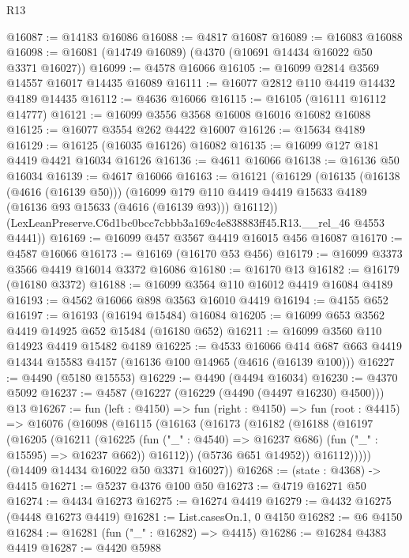 \begin{lexlean}{R13}
\begin{coremodule}
@16087 := @14183 @16086
@16088 := @4817 @16087
@16089 := @16083 @16088
@16098 := @16081 (@14749 @16089) (@4370 (@10691 @14434 @16022 @50 @3371 @16027))
@16099 := @4578 @16066
@16105 := @16099 @2814 @3569 @14557 @16017 @14435 @16089
@16111 := @16077 @2812 @110 @4419 @14432 @4189 @14435
@16112 := @4636 @16066
@16115 := @16105 (@16111 @16112 @14777)
@16121 := @16099 @3556 @3568 @16008 @16016 @16082 @16088
@16125 := @16077 @3554 @262 @4422 @16007
@16126 := @15634 @4189
@16129 := @16125 (@16035 @16126) @16082
@16135 := @16099 @127 @181 @4419 @4421 @16034 @16126
@16136 := @4611 @16066
@16138 := @16136 @50 @16034
@16139 := @4617 @16066
@16163 := @16121
    (@16129
      (@16135
        (@16138 (@4616 (@16139 @50)))
        (@16099 @179 @110 @4419 @4419 @15633 @4189 (@16136 @93 @15633 (@4616 (@16139 @93))) @16112))
      (LexLeanPreserve.C6d1bc0bcc7cbbb3a169c4e838883ff45.R13.__rel_46 @4553 @4441))
@16169 := @16099 @457 @3567 @4419 @16015 @456 @16087
@16170 := @4587 @16066
@16173 := @16169 (@16170 @53 @456)
@16179 := @16099 @3373 @3566 @4419 @16014 @3372 @16086
@16180 := @16170 @13
@16182 := @16179 (@16180 @3372)
@16188 := @16099 @3564 @110 @16012 @4419 @16084 @4189
@16193 := @4562 @16066 @898 @3563 @16010 @4419
@16194 := @4155 @652
@16197 := @16193 (@16194 @15484) @16084
@16205 := @16099 @653 @3562 @4419 @14925 @652 @15484 (@16180 @652)
@16211 := @16099 @3560 @110 @14923 @4419 @15482 @4189
@16225 := @4533
    @16066
    @414
    @687
    @663
    @4419
    @14344
    @15583
    @4157
    (@16136 @100 @14965 (@4616 (@16139 @100)))
@16227 := @4490 (@5180 @15553)
@16229 := @4490 (@4494 @16034)
@16230 := @4370 @5092
@16237 := @4587 (@16227 (@16229 (@4490 (@4497 @16230) @4500))) @13
@16267 := fun (left : @4150) =>
  fun (right : @4150) =>
  fun (root : @4415) =>
  @16076
    (@16098
      (@16115
        (@16163
          (@16173
            (@16182
              (@16188
                (@16197
                  (@16205
                    (@16211
                      (@16225
                        (fun ("_" : @4540) => @16237 @686)
                        (fun ("_" : @15595) => @16237 @662))
                      @16112))
                  (@5736 @651 @14952))
                @16112)))))
      (@14409 @14434 @16022 @50 @3371 @16027))
@16268 := (state : @4368) -> @4415
@16271 := @5237 @4376 @100 @50
@16273 := @4719 @16271 @50
@16274 := @4434 @16273
@16275 := @16274 @4419
@16279 := @4432 @16275 (@4448 @16273 @4419)
@16281 := List.casesOn.{1, 0} @4150
@16282 := @6 @4150
@16284 := @16281 (fun ("_" : @16282) => @4415)
@16286 := @16284 @4383 @4419
@16287 := @4420 @5988

\end{coremodule}
\end{lexlean}
